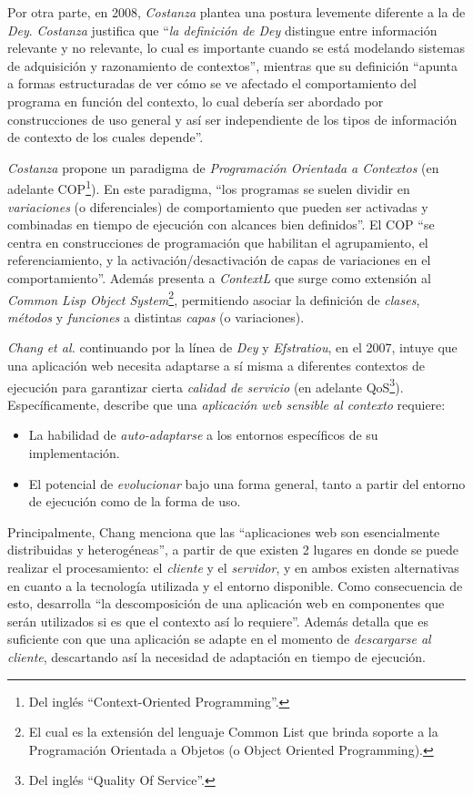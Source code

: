 Por otra parte, en 2008, \emph{Costanza} plantea una postura levemente diferente a la de \emph{Dey}. \emph{Costanza} justifica que ``\emph{la definición de Dey} distingue entre información relevante y no relevante, lo cual es importante cuando se está modelando sistemas de adquisición y razonamiento de contextos'', mientras que su definición ``apunta a formas estructuradas de ver cómo se ve afectado el comportamiento del programa en función del contexto, lo cual debería ser abordado por construcciones de uso general y así ser independiente de los tipos de información de contexto de los cuales depende''\cite[p.~1]{Costanza08}.

\emph{Costanza} propone un paradigma de \emph{Programación Orientada a Contextos} (en adelante COP\footnote{Del inglés ``Context-Oriented Programming''.}). En este paradigma, ``los programas se suelen dividir en \emph{variaciones} (o diferenciales) de comportamiento que pueden ser activadas y combinadas en tiempo de ejecución con alcances bien definidos''. El COP ``se centra en construcciones de programación que habilitan el agrupamiento, el referenciamiento, y la activación/desactivación de capas de variaciones en el comportamiento''. Además presenta a \emph{ContextL} que surge como extensión al \emph{Common Lisp Object System}\footnote{El cual es la extensión del lenguaje Common List que brinda soporte a la Programación Orientada a Objetos (o Object Oriented Programming).}, permitiendo asociar la definición de \emph{clases}, \emph{métodos} y \emph{funciones} a distintas \emph{capas} (o variaciones).

\emph{Chang et al.} continuando por la línea de \emph{Dey} y \emph{Efstratiou}, en el 2007, intuye que una aplicación web necesita adaptarse a sí misma a diferentes contextos de ejecución para garantizar cierta \emph{calidad de servicio} (en adelante QoS\footnote{Del inglés ``Quality Of Service''.})\cite[p.~1]{Chang07}. Específicamente, describe que una \emph{aplicación web sensible al contexto} requiere:
\begin{itemize}
	\item La habilidad de \emph{auto-adaptarse} a los entornos específicos de su implementación.
	\item El potencial de \emph{evolucionar} bajo una forma general, tanto a partir del entorno de ejecución como de la forma de uso.
\end{itemize}

Principalmente, Chang menciona que las ``aplicaciones web son esencialmente distribuidas y heterogéneas'', a partir de que existen 2 lugares en donde se puede realizar el procesamiento: el \emph{cliente} y el \emph{servidor}, y en ambos existen alternativas en cuanto a la tecnología utilizada y el entorno disponible. Como consecuencia de esto, desarrolla ``la descomposición de una aplicación web en componentes que serán utilizados si es que el contexto así lo requiere''. Además detalla que es suficiente con que una aplicación se adapte en el momento de \emph{descargarse al cliente}, descartando así la necesidad de adaptación en tiempo de ejecución.

